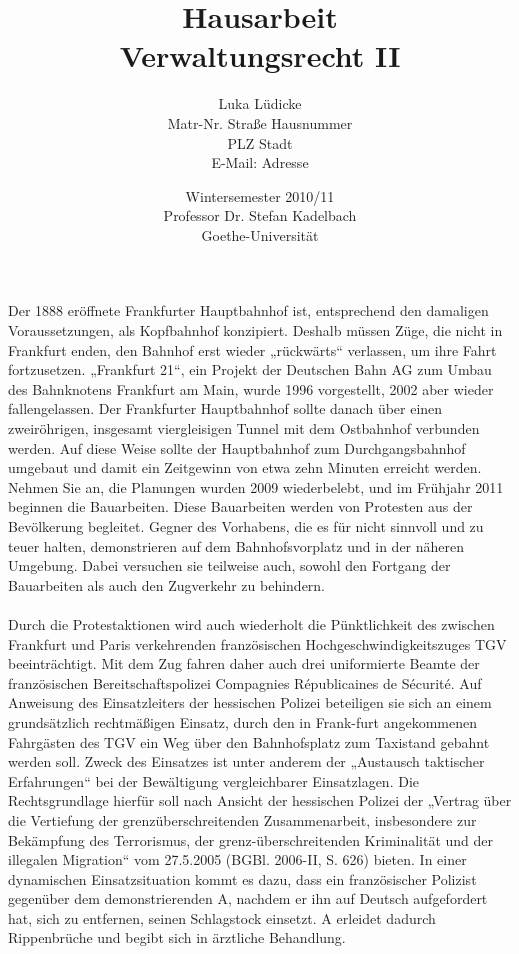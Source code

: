 \documentclass[widefront, ngerman]{jura}
\begin{document}
\frontmatter
\author{Luka Lüdicke\\
Matr-Nr. %
Straße Hausnummer\\PLZ Stadt\\
E-Mail: Adresse}
\title{Hausarbeit\\ Verwaltungsrecht II}
\date{Wintersemester 2010/11\\
Professor Dr. Stefan Kadelbach\\
Goethe-Universität}

\maketitle

\begin{sachverhalt}
Der 1888 eröffnete Frankfurter Hauptbahnhof ist, entsprechend den damaligen Voraussetzungen, als Kopfbahnhof konzipiert. Deshalb müssen Züge, die nicht in Frankfurt enden, den Bahnhof erst wieder „rückwärts“ verlassen, um ihre Fahrt fortzusetzen. „Frankfurt 21“, ein Projekt der Deutschen Bahn AG zum Umbau des Bahnknotens Frankfurt am Main, wurde 1996 vorgestellt, 2002 aber wieder fallengelassen. Der Frankfurter Hauptbahnhof sollte danach über einen zweiröhrigen, insgesamt viergleisigen Tunnel mit dem Ostbahnhof verbunden werden. Auf diese Weise sollte der Hauptbahnhof zum Durchgangsbahnhof umgebaut und damit ein Zeitgewinn von etwa zehn Minuten erreicht werden. Nehmen Sie an, die Planungen wurden 2009 wiederbelebt, und im Frühjahr 2011 beginnen die Bauarbeiten. Diese Bauarbeiten werden von Protesten aus der Bevölkerung begleitet. Gegner des Vorhabens, die es für nicht sinnvoll und zu teuer halten, demonstrieren auf dem Bahnhofsvorplatz und in der näheren Umgebung. Dabei versuchen sie teilweise auch, sowohl den Fortgang der Bauarbeiten als auch den Zugverkehr zu behindern.\\
\\
Durch die Protestaktionen wird auch wiederholt die Pünktlichkeit des zwischen Frankfurt und Paris verkehrenden französischen Hochgeschwindigkeitszuges TGV beeinträchtigt. Mit dem Zug fahren daher auch drei uniformierte Beamte der französischen Bereitschaftspolizei Compagnies Républicaines de Sécurité. Auf Anweisung des Einsatzleiters der hessischen Polizei beteiligen sie sich an einem grundsätzlich rechtmäßigen Einsatz, durch den in Frank-furt angekommenen Fahrgästen des TGV ein Weg über den Bahnhofsplatz zum Taxistand gebahnt werden soll. Zweck des Einsatzes ist unter anderem der „Austausch taktischer Erfahrungen“ bei der Bewältigung vergleichbarer Einsatzlagen. Die Rechtsgrundlage hierfür soll nach Ansicht der hessischen Polizei der „Vertrag über die Vertiefung der grenzüberschreitenden Zusammenarbeit, insbesondere zur Bekämpfung des Terrorismus, der grenz-überschreitenden Kriminalität und der illegalen Migration“ vom 27.5.2005 (BGBl. 2006-II, S. 626) bieten. In einer dynamischen Einsatzsituation kommt es dazu, dass ein französischer Polizist gegenüber dem demonstrierenden A, nachdem er ihn auf Deutsch aufgefordert hat, sich zu entfernen, seinen Schlagstock einsetzt. A erleidet dadurch Rippenbrüche und begibt sich in ärztliche Behandlung.\\

\end{sachverhalt}
\end{document}
